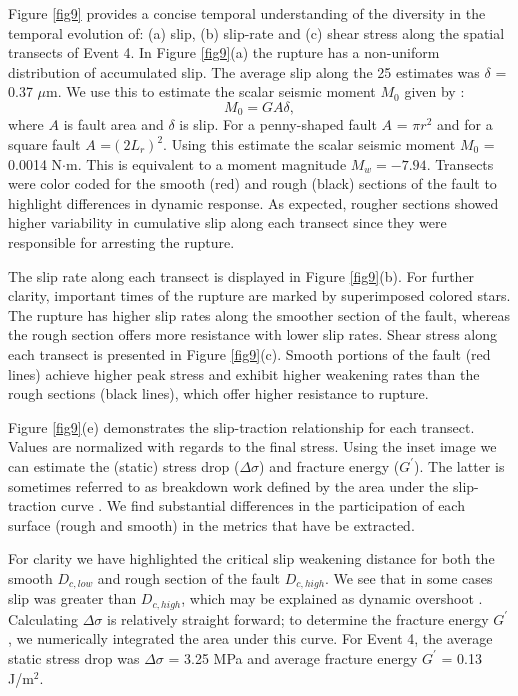 \documentclass[preprint,1p, 10pt,authoryear]{elsarticle}
\begin{document}
Figure \ref{fig9} provides a concise temporal understanding of the diversity in the temporal evolution of: (a) slip, (b) slip-rate and (c) shear stress along the spatial transects of Event 4. In Figure \ref{fig9}(a) the rupture has a non-uniform distribution of accumulated slip. The average slip along the 25 estimates was $\delta$ = 0.37 $\mu$m.  We use this to estimate the scalar seismic moment $M_{0}$ given by \citet{Aki1966}: 
\begin{equation}
M_{0} = G A \delta, 
\label{eq9}
\end{equation}
\noindent where $A$ is fault area and $\delta$ is slip. For a penny-shaped fault $A$ = $\pi r^{2}$ and for a square fault $A$ =$(2L_{r})^{2}$. Using this estimate the scalar seismic moment $M_{0}$ = 0.0014 N$\cdot$m. This is equivalent to a moment magnitude $M_{w} = -7.94$.  Transects were color coded for the smooth (red) and rough (black) sections of the fault to highlight differences in dynamic response. As expected, rougher sections showed higher variability in cumulative slip along each transect since they were responsible for arresting the rupture.    

The slip rate along each transect is displayed in Figure \ref{fig9}(b). For further clarity, important times of the rupture are marked by superimposed colored stars. The rupture has higher slip rates along the smoother section of the fault, whereas the rough section offers more resistance with lower slip rates. Shear stress along each transect is presented in Figure \ref{fig9}(c). Smooth portions of the fault (red lines) achieve higher peak stress and exhibit higher weakening rates than the rough sections (black lines), which offer higher resistance to rupture.

Figure \ref{fig9}(e) demonstrates the slip-traction relationship for each transect. Values are normalized with regards to the final stress. Using the inset image we can estimate the (static) stress drop ($\Delta\sigma$) and fracture energy ($G^{'}$).  The latter is sometimes referred to as breakdown work defined by the area under the slip-traction curve \citep[e.g.,][]{Tinti2005, Cocco2016}. We find substantial differences in the participation of each surface (rough and smooth) in the metrics that have be extracted. 

For clarity we have highlighted the critical slip weakening distance for both the smooth $D_{c,low}$ and rough section of the fault $D_{c, high}$. We see that in some cases slip was greater than $D_{c, high}$, which may be explained as dynamic overshoot \citep{Madariaga1976}. Calculating $\Delta \sigma$ is relatively straight forward; to determine the fracture energy $G^{'}$, we numerically integrated the area under this curve. For Event 4, the average static stress drop was $\Delta\sigma$ = 3.25 MPa and average fracture energy $G^{'}$ = 0.13 J/m$^{2}$.  
\end{document}
